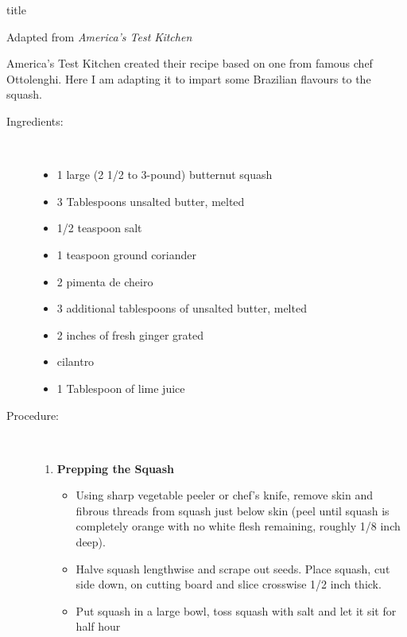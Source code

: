 \documentclass [11pt, letterpaper] {article}
\begin{document}
 {title}

\begin{flushright}
Adapted from {\it America's Test Kitchen}
\end{flushright}

America's Test Kitchen created their recipe based on one from famous chef Ottolenghi. Here I am adapting it to impart some Brazilian flavours to the squash. 

\vspace{0.3in}

\begin{description}

\item[Ingredients:]\ \\
	\begin{itemize}
	\item 1 large (2 1/2 to 3-pound) butternut squash
	\item 3 Tablespoons unsalted butter, melted
	\item 1/2 teaspoon salt
        \item  1 teaspoon ground coriander
        \item  2 pimenta de cheiro
        \item 3 additional tablespoons of unsalted butter, melted
	\item 2 inches of fresh ginger grated
	\item	cilantro
	\item 1 Tablespoon of lime juice
	\end{itemize}

\item[Procedure:]\ \\

	\begin{enumerate}
	\item {\bf Prepping the Squash}
	\begin{itemize}
	\item Using sharp vegetable peeler or chef's knife, remove skin and fibrous threads from squash just below skin (peel until squash is completely orange with no white flesh remaining, roughly 1/8 inch deep). 
	\item Halve squash lengthwise and scrape out seeds. Place squash, cut side down, on cutting board and slice crosswise 1/2 inch thick.
	\item Put squash in a large bowl, toss squash with salt and let it sit for half hour
	\end{itemize}
	

\end{enumerate}
\end{description}
\end{document}
